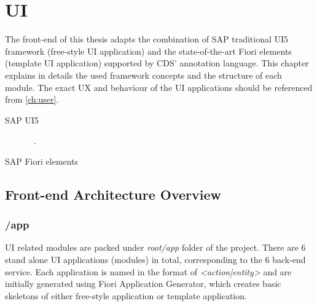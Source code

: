 \section{UI}
\label{sec:D-UI}

The front-end of this thesis adapts the combination of SAP traditional UI5 framework (free-style UI application) and the state-of-the-art Fiori elements (template UI application) supported by CDS' annotation language. \cite{fiori-design} This chapter explains in details the used framework concepts and the structure of each module. The exact UX and behaviour of the UI applications should be referenced from \autoref{ch:user}.

\begin{description} 
	\item[SAP UI5] ~\cite{ui5}.

\end{description}
\begin{description} 
	\item[SAP Fiori elements] 
      
\end{description}

\subsection{Front-end Architecture Overview}

\subsubsection{/app}

UI related modules are packed under \textit{root/app} folder of the project. There are 6 stand alone UI applications (modules) in total, corresponding to the 6 back-end service. Each application is named in the format of \textit{<action|entity>} and are initially generated using Fiori Application Generator, which creates basic skeletons of either free-style application or template application. 

